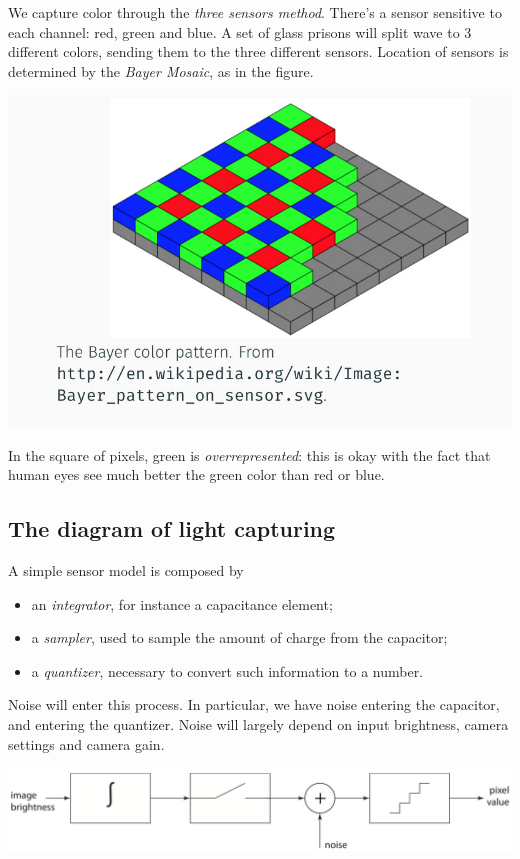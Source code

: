 \documentclass[10pt]{report}
\begin{document}
We capture color through the \emph{three sensors method}. There's a sensor
sensitive to each channel: red, green and blue. A set of glass prisons
will split wave to 3 different colors, sending them to the three
different sensors. Location of sensors is determined by the \emph{Bayer
Mosaic}, as in the figure.

\begin{center}
\includegraphics[width=.9\linewidth]{./pics/visio/bayer-mosaic.jpg}
\end{center}

In the square of pixels, green is \emph{overrepresented}: this is okay with
the fact that human eyes see much better the green color than red or
blue.

\subsection{The diagram of light capturing}
\label{the-diagram-of-light-capturing}
A simple sensor model is composed by

\begin{itemize}
\item an \emph{integrator}, for instance a capacitance element;
\item a \emph{sampler}, used to sample the amount of charge from the capacitor;
\item a \emph{quantizer}, necessary to convert such information to a number.
\end{itemize}

Noise will enter this process. In particular, we have noise entering the
capacitor, and entering the quantizer. Noise will largely depend on
input brightness, camera settings and camera gain.

\begin{center}
\includegraphics[width=.9\linewidth]{./pics/visio/light-capturing.jpg}
\end{center}
\end{document}

